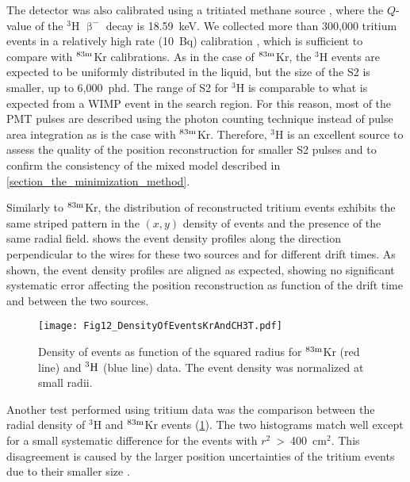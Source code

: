 \documentclass[a4paper,11pt]{article}
\begin{document}
The detector was also calibrated using a tritiated methane source \cite{TritiumPaper2015, AttilaDobi2015}, where the $Q$-value of the ${}^{3}$H $\upbeta^-$ decay is 18.59~keV. We collected more than 300,000 tritium events in a relatively high rate (10~Bq) calibration \cite{TritiumPaper2015}, which is sufficient to compare with ${}^{{\rm 83m}}$Kr calibrations. As in the case of ${}^{\rm 83m}$Kr, the ${}^{3}$H events are expected to be uniformly distributed in the liquid, but the size of the S2 is smaller, up to 6,000~phd. The range of S2 for  ${}^{3}$H is comparable to what is expected from a WIMP event in the search region. For this reason, most of the PMT pulses are described using the photon counting technique instead of pulse area integration as is the case with ${}^{\rm 83m}$Kr. Therefore, ${}^{3}$H is an excellent source to assess the quality of the position reconstruction for smaller S2 pulses and to confirm the consistency of the mixed model described in \cref{section_the_minimization_method}.
 
Similarly to ${}^{{\rm 83m}}$Kr, the distribution of reconstructed tritium events exhibits the same striped pattern in the $(x, y)$ density of events and the presence of the same radial field.  shows the event density profiles along the direction perpendicular to the wires for these two sources and for different drift times. As shown, the event density profiles are aligned as expected, showing  no significant systematic error affecting the position reconstruction as function of the drift time and between the two sources. 

\begin{figure}
 \begin{center}
   \texttt{[image: Fig12\_DensityOfEventsKrAndCH3T.pdf]}
\caption{Density of events as function of the squared radius for  ${}^{{\rm 83m}}$Kr (red line) and ${}^{3}{\rm H}$ (blue line) data. The event density was normalized at small radii.}
  \label{Fig20_DensityOfEventsKrAndCH3T}
 \end{center}
\end{figure}

Another test performed using tritium data was the comparison between the radial density of ${}^{3}$H and ${}^{{\rm 83m}}$Kr events (\cref{Fig20_DensityOfEventsKrAndCH3T}). The two histograms match well except for a small systematic difference for the events with $r^2$~>~400~cm${}^{2}$. This disagreement is caused by the larger position uncertainties of the tritium events due to their smaller size \cite{LUX2015_ReanalysisPRD}.
\end{document}
